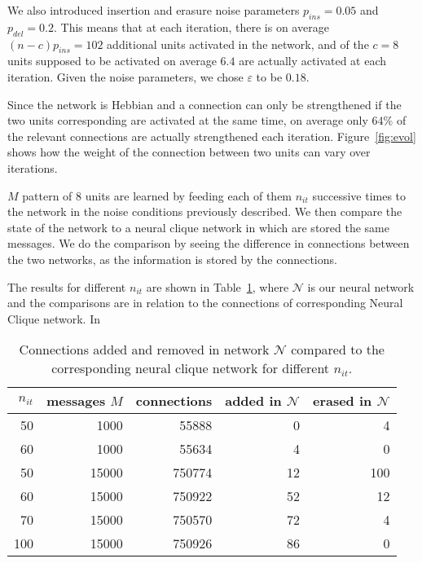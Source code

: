 \documentclass[journal]{IEEEtran}
\begin{document}
We also introduced insertion and erasure noise parameters $p_{ins}=0.05$ and $p_{del}=0.2$. This means that at each iteration, there is on average $(n-c) p_{ins} = 102$ additional units activated in the network, and of the $c=8$ units supposed to be activated on average $ 6.4 $ are actually activated at each iteration. Given the noise parameters, we chose $\varepsilon$ to be $0.18$.

Since the network is Hebbian and a connection can only be strengthened if the two units corresponding are activated at the same time, on average only $64\%$ of the relevant connections are actually strengthened each iteration. Figure~\ref{fig:evol} shows how the weight of the connection between two units can vary over iterations.

$M$ pattern of 8 units are learned by feeding each of them $n_{it}$ successive times to the network in the noise conditions previously described. We then compare the state of the network to a neural clique network in which are stored the same messages. We do the comparison by seeing the difference in connections between the two networks, as the information is stored by the connections. 

The results for different $n_{it}$ are shown in Table~\ref{fig:bac}, where $\mathcal{N}$ is our neural network and the comparisons are in relation to the connections of corresponding Neural Clique network. In 

\begin{table}[ht!]
\begin{center}
\begin{tabular}{|r|r|r|r|r|}
  \hline
  $n_{it}$ & messages $M$ & connections & added in $\mathcal{N}$ & erased in $\mathcal{N}$ \\
  \hline
  50 & 1000 & 55888 & 0 & 4 \\
  60 & 1000 & 55634 & 4 & 0 \\
  50 & 15000 & 750774 & 12 & 100 \\
  60 & 15000 & 750922 & 52 & 12 \\
  70 & 15000 & 750570 & 72 & 4 \\
  100 & 15000 & 750926 & 86 & 0 \\
  \hline
\end{tabular}
\end{center}
\caption{Connections added and removed in network $\mathcal{N}$ compared to the corresponding neural clique network for different $n_{it}$.}
\label{fig:bac}
\end{table}
\end{document}
